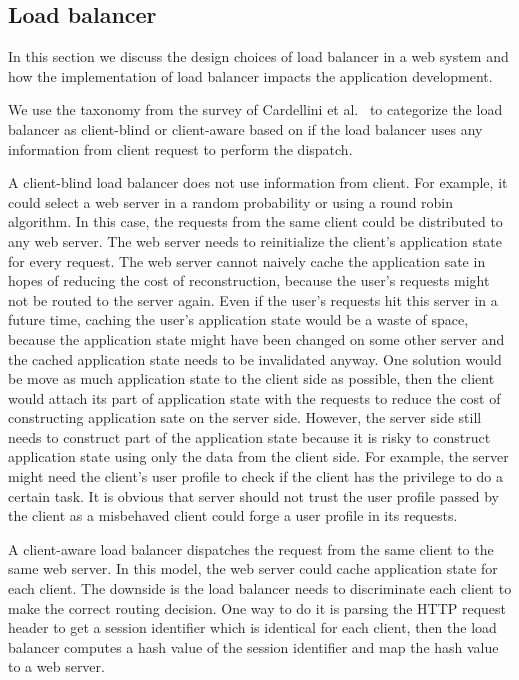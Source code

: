 \subsection{Load balancer}

In this section we discuss the design choices of load balancer in a web system
and how the implementation of load balancer impacts the application development.

We use the taxonomy from the survey of Cardellini et al.~\cite{cardellini2002state}
to categorize the load balancer as client-blind or client-aware based on if 
the load balancer uses any information from client request to perform the dispatch.

A client-blind load balancer does not use information from client.
For example, it could select a web server in a random probability or using a round robin algorithm.
In this case, the requests from the same client could be distributed to any web server.
The web server needs to reinitialize the client's application state for every request.
The web server cannot naively cache the application sate in hopes of reducing the
cost of reconstruction, 
because the user's requests might not be routed to the server again.
Even if the user's requests hit this server in a future time,
caching the user's application state would be a waste of space,
because the application state might have been changed on some other server
and the cached application state needs to be invalidated anyway.
One solution would be move as much application state to the client side as possible,
then the client would attach its part of application state 
with the requests to reduce the cost of constructing application sate on the server side.
However, the server side still needs to construct part of the application state
because it is risky to construct application state using only the data from 
the client side.
For example,
the server might need the client's user profile to check if the client has 
the privilege to do a certain task.
It is obvious that server should not trust the user profile passed by the client
as a misbehaved client could forge a user profile in its requests.

A client-aware load balancer dispatches the request from the same
client to the same web server.
In this model, the web server could cache application state for each client.
The downside is the load balancer needs to discriminate each client 
to make the correct routing decision.
One way to do it is parsing the HTTP request header to get
a session identifier which is identical for each client,
then the load balancer computes a hash value of 
the session identifier and map the hash value to a web server.


